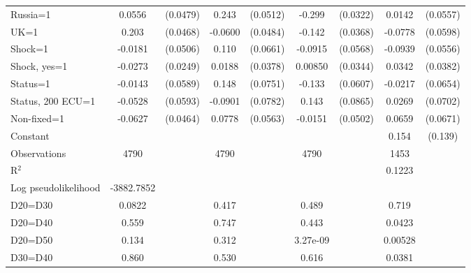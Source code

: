\begin{tabular}{l|cccccc|cc}
Russia=1        &   0.0556         & (0.0479)&    0.243\sym{***}& (0.0512)&   -0.299\sym{***}& (0.0322)&   0.0142         & (0.0557)\\
UK=1            &    0.203\sym{***}& (0.0468)&  -0.0600         & (0.0484)&   -0.142\sym{***}& (0.0368)&  -0.0778         & (0.0598)\\
Shock=1         &  -0.0181         & (0.0506)&    0.110\sym{*}  & (0.0661)&  -0.0915         & (0.0568)&  -0.0939\sym{*}  & (0.0556)\\
Shock, yes=1    &  -0.0273         & (0.0249)&   0.0188         & (0.0378)&  0.00850         & (0.0344)&   0.0342         & (0.0382)\\
Status=1        &  -0.0143         & (0.0589)&    0.148\sym{**} & (0.0751)&   -0.133\sym{**} & (0.0607)&  -0.0217         & (0.0654)\\
Status, 200 ECU=1&  -0.0528         & (0.0593)&  -0.0901         & (0.0782)&    0.143\sym{*}  & (0.0865)&   0.0269         & (0.0702)\\
Non-fixed=1     &  -0.0627         & (0.0464)&   0.0778         & (0.0563)&  -0.0151         & (0.0502)&   0.0659         & (0.0671)\\
Constant        &                  &         &                  &         &                  &         &    0.154         &  (0.139)\\
\hline
Observations    &     4790         &         &     4790         &         &     4790         &         &     1453         &         \\
R$^2$      &                  &         &                  &         &                  &         &     0.1223      &   \\ 
Log pseudolikelihood  & -3882.7852   &         &                  &         &                  &         &           &   \\ 
D20=D30         &   0.0822         &         &    0.417         &         &    0.489         &         &    0.719         &         \\
D20=D40         &    0.559         &         &    0.747         &         &    0.443         &         &   0.0423         &         \\
D20=D50         &    0.134         &         &    0.312         &         & 3.27e-09         &         &  0.00528         &         \\
D30=D40         &    0.860         &         &    0.530         &         &    0.616         &         &   0.0381         &         \\

\end{tabular}
